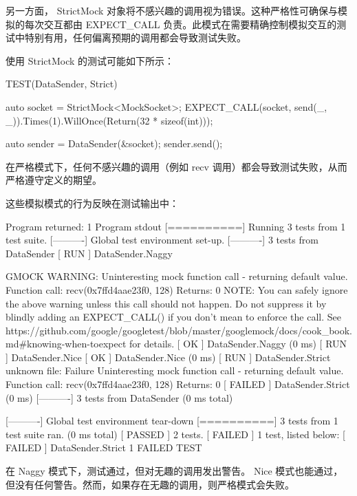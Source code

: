 
另一方面， StrictMock 对象将不感兴趣的调用视为错误。这种严格性可确保与模拟的每次交互都由 EXPECT\_CALL 负责。此模式在需要精确控制模拟交互的测试中特别有用，任何偏离预期的调用都会导致测试失败。

使用 StrictMock 的测试可能如下所示：

\begin{cpp}
TEST(DataSender, Strict) {
    auto socket = StrictMock<MockSocket>{};
    EXPECT_CALL(socket, send(_, _)).Times(1).WillOnce(Return(32 * sizeof(int)));

    auto sender = DataSender(&socket);
    sender.send();
}
\end{cpp}

在严格模式下，任何不感兴趣的调用（例如 recv 调用）都会导致测试失败，从而严格遵守定义的期望。


这些模拟模式的行为反映在测试输出中：

\begin{shell}
Program returned: 1
Program stdout
[==========] Running 3 tests from 1 test suite.
[----------] Global test environment set-up.
[----------] 3 tests from DataSender
[ RUN      ] DataSender.Naggy

GMOCK WARNING:
Uninteresting mock function call - returning default value.
    Function call: recv(0x7ffd4aae23f0, 128)
        Returns: 0
NOTE: You can safely ignore the above warning unless this call should not happen. Do not suppress it by blindly adding an EXPECT_CALL() if you don't mean to enforce the call. See https://github.com/google/googletest/blob/master/googlemock/docs/cook_book.md#knowing-when-toexpect for details.
[       OK ] DataSender.Naggy (0 ms)
[ RUN      ] DataSender.Nice
[       OK ] DataSender.Nice (0 ms)
[ RUN      ] DataSender.Strict
unknown file: Failure
Uninteresting mock function call - returning default value.
    Function call: recv(0x7ffd4aae23f0, 128)
        Returns: 0
[ FAILED ] DataSender.Strict (0 ms)
[----------] 3 tests from DataSender (0 ms total)

[----------] Global test environment tear-down
[==========] 3 tests from 1 test suite ran. (0 ms total)
[  PASSED  ] 2 tests.
[  FAILED  ] 1 test, listed below:
[  FAILED  ] DataSender.Strict
1 FAILED TEST
\end{shell}

在 Naggy 模式下，测试通过，但对无趣的调用发出警告。 Nice 模式也能通过，但没有任何警告。然而，如果存在无趣的调用，则严格模式会失败。

